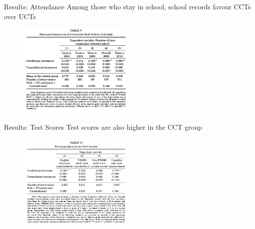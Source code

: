 \documentclass[11pt,notes=hide,aspectratio=169,mathserif]{beamer}
\begin{document}
\begin{frame}{Results: Attendance}
Among those who stay in school, school records favour CCTs over UCTs
\begin{figure}
\centering
\includegraphics[width=0.5\textwidth]{inputs/table8.png}
\end{figure}
\end{frame}

\begin{frame}{Results: Test Scores}
Test scores are also higher in the CCT group
\begin{figure}
\centering
\includegraphics[width=0.5\textwidth]{inputs/table9.png}
\end{figure}
\end{frame}
\end{document}
